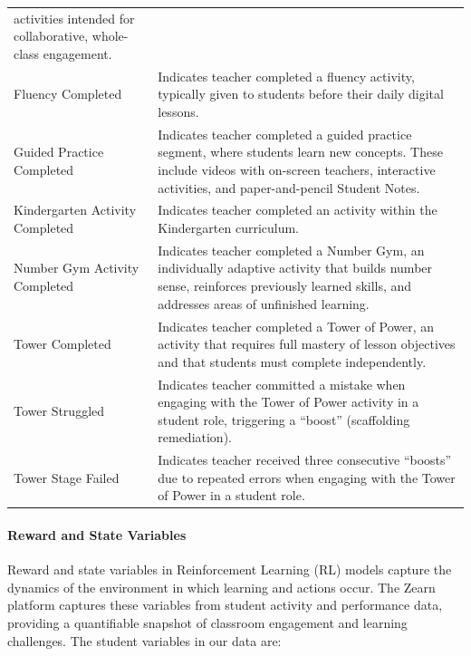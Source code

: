\documentclass[
  number,
  preprint,
  3p,
  onecolumn]{elsarticle}
\let\oldparagraph\paragraph
\renewcommand{\paragraph}[1]{\oldparagraph{#1}\mbox{}}
\begin{document}
\begin{longtable}[]{@{}
  >{\raggedright\arraybackslash}p{}
  >{\raggedright\arraybackslash}p{}@{}}
activities intended for collaborative, whole-class engagement. \\
Fluency Completed \citep{lesson-a} & Indicates teacher completed a
fluency activity, typically given to students before their daily digital
lessons. \\
Guided Practice Completed \citep{zearnr} & Indicates teacher completed a
guided practice segment, where students learn new concepts. These
include videos with on-screen teachers, interactive activities, and
paper-and-pencil Student Notes. \\
Kindergarten Activity Completed \citep{zearns} & Indicates teacher
completed an activity within the Kindergarten curriculum. \\
Number Gym Activity Completed \citep{zearnt} & Indicates teacher
completed a Number Gym, an individually adaptive activity that builds
number sense, reinforces previously learned skills, and addresses areas
of unfinished learning. \\
Tower Completed \citep{zearnu} & Indicates teacher completed a Tower of
Power, an activity that requires full mastery of lesson objectives and
that students must complete independently. \\
Tower Struggled \citep{zearnac} & Indicates teacher committed a mistake
when engaging with the Tower of Power activity in a student role,
triggering a ``boost'' (scaffolding remediation). \\
Tower Stage Failed \citep{zearnad} & Indicates teacher received three
consecutive ``boosts'' due to repeated errors when engaging with the
Tower of Power in a student role. \\
\end{longtable}

\paragraph{Reward and State Variables}\label{reward-and-state-variables}

Reward and state variables in Reinforcement Learning (RL) models capture
the dynamics of the environment in which learning and actions occur. The
Zearn platform captures these variables from student activity and
performance data, providing a quantifiable snapshot of classroom
engagement and learning challenges. The student variables in our data
are:
\end{document}
